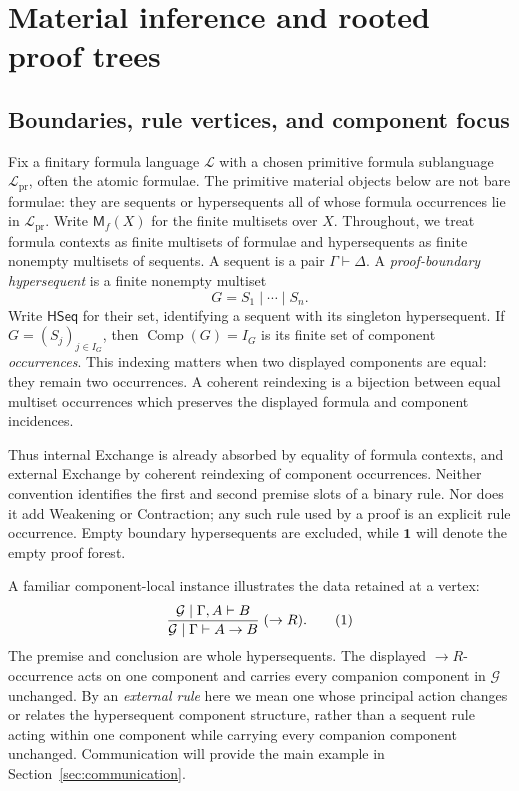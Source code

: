 \documentclass[10pt,a4paper]{article}
\theoremstyle{plain}
\theoremstyle{definition}
\theoremstyle{remark}
\newcommand{\Lang}{\mathcal L}
\newcommand{\ms}{\mathrel{\vdash}}
\newcommand{\HSeq}{\mathsf{HSeq}}
\newcommand{\one}{\mathbf 1}
\newcommand{\Comp}{\operatorname{Comp}}
\newcommand{\eqtag}{\refstepcounter{equation}\tag{\theequation}}
\begin{document}
\section{Material inference and rooted proof trees}
\label{sec:interfaces}

\subsection{Boundaries, rule vertices, and component focus}

Fix a finitary formula language \(\Lang\) with a chosen primitive formula
sublanguage \(\Lang_{\mathrm{pr}}\), often the atomic formulae.  The
primitive material objects below are not bare formulae: they are sequents
or hypersequents all of whose formula occurrences lie in
\(\Lang_{\mathrm{pr}}\).  Write \(\mathsf M_f(X)\) for the finite
multisets over \(X\).  Throughout, we treat formula contexts as finite
multisets of formulae and hypersequents as finite nonempty multisets of
sequents.  A sequent is a pair \(\Gamma\ms\Delta\).  A \emph{proof-boundary
hypersequent} is a finite nonempty multiset
\[
                 G=S_1\mid\cdots\mid S_n .
\]
Write \(\HSeq\) for their set, identifying a sequent with its singleton
hypersequent.  If \(G=(S_j)_{j\in I_G}\), then
\(\Comp(G)=I_G\) is its finite set of component \emph{occurrences}.
This indexing matters when two displayed components are equal: they remain
two occurrences.  A coherent reindexing is a bijection between equal
multiset occurrences which preserves the displayed formula and component
incidences.

Thus internal Exchange is already absorbed by equality of formula contexts,
and external Exchange by coherent
reindexing of component occurrences.  Neither convention identifies the
first and second premise slots of a binary rule.  Nor does it add
Weakening or Contraction; any such rule used by a proof is an explicit
rule occurrence.  Empty boundary hypersequents are excluded, while
\(\one\) will denote the empty proof forest.

A familiar component-local instance illustrates the data retained at a
vertex:
\[
 \frac{\mathcal G\mid\Gamma,A\ms B}
      {\mathcal G\mid\Gamma\ms A\to B}\;(\to R).
\eqtag\label{eq:component-local-example}
\]
The premise and conclusion are whole hypersequents.  The displayed
\(\to R\)-occurrence acts on one component and carries every companion
component in \(\mathcal G\) unchanged.  By an \emph{external rule} here we
mean one whose principal action changes or relates the hypersequent
component structure, rather than a sequent rule acting within one component
while carrying every companion component unchanged.  Communication will
provide the main example in Section~\ref{sec:communication}.
\end{document}
